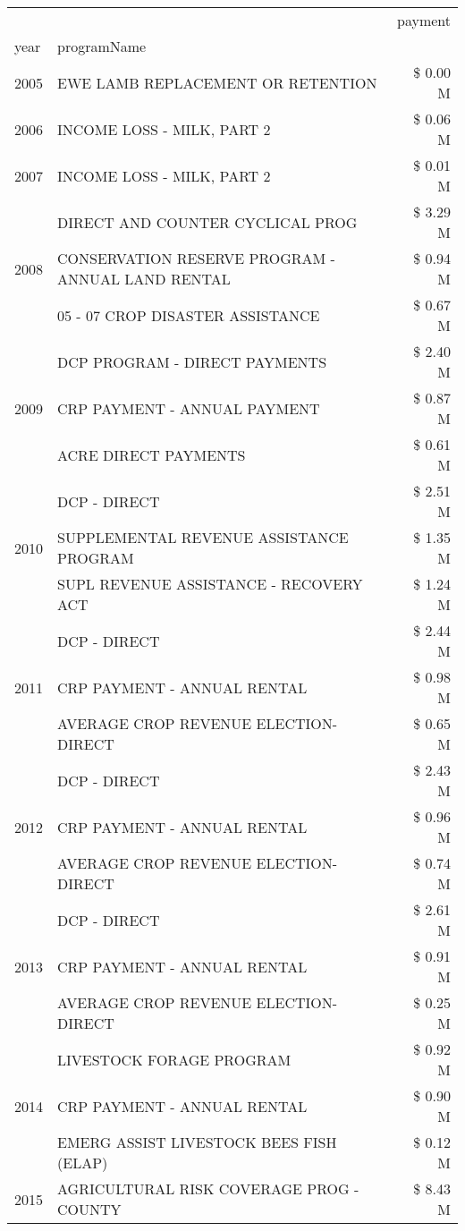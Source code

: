 \begin{tabular}{llr}
\toprule
 &  & payment \\
year & programName &  \\
\midrule
2005 & EWE LAMB REPLACEMENT OR RETENTION & \$ 0.00 M \\
\cline{1-3}
2006 & INCOME LOSS - MILK, PART 2 & \$ 0.06 M \\
\cline{1-3}
2007 & INCOME LOSS - MILK, PART 2 & \$ 0.01 M \\
\cline{1-3}
\multirow[t]{3}{*}{2008} & DIRECT AND COUNTER CYCLICAL PROG & \$ 3.29 M \\
 & CONSERVATION RESERVE PROGRAM - ANNUAL LAND RENTAL & \$ 0.94 M \\
 & 05 - 07 CROP DISASTER ASSISTANCE & \$ 0.67 M \\
\cline{1-3}
\multirow[t]{3}{*}{2009} & DCP PROGRAM - DIRECT PAYMENTS & \$ 2.40 M \\
 & CRP PAYMENT - ANNUAL PAYMENT & \$ 0.87 M \\
 & ACRE DIRECT PAYMENTS & \$ 0.61 M \\
\cline{1-3}
\multirow[t]{3}{*}{2010} & DCP - DIRECT & \$ 2.51 M \\
 & SUPPLEMENTAL REVENUE ASSISTANCE PROGRAM & \$ 1.35 M \\
 & SUPL REVENUE ASSISTANCE - RECOVERY ACT & \$ 1.24 M \\
\cline{1-3}
\multirow[t]{3}{*}{2011} & DCP - DIRECT & \$ 2.44 M \\
 & CRP PAYMENT - ANNUAL RENTAL & \$ 0.98 M \\
 & AVERAGE CROP REVENUE ELECTION-DIRECT & \$ 0.65 M \\
\cline{1-3}
\multirow[t]{3}{*}{2012} & DCP - DIRECT & \$ 2.43 M \\
 & CRP PAYMENT - ANNUAL RENTAL & \$ 0.96 M \\
 & AVERAGE CROP REVENUE ELECTION-DIRECT & \$ 0.74 M \\
\cline{1-3}
\multirow[t]{3}{*}{2013} & DCP - DIRECT & \$ 2.61 M \\
 & CRP PAYMENT - ANNUAL RENTAL & \$ 0.91 M \\
 & AVERAGE CROP REVENUE ELECTION-DIRECT & \$ 0.25 M \\
\cline{1-3}
\multirow[t]{3}{*}{2014} & LIVESTOCK FORAGE PROGRAM & \$ 0.92 M \\
 & CRP PAYMENT - ANNUAL RENTAL & \$ 0.90 M \\
 & EMERG ASSIST LIVESTOCK BEES FISH (ELAP) & \$ 0.12 M \\
\cline{1-3}
\multirow[t]{3}{*}{2015} & AGRICULTURAL RISK COVERAGE PROG - COUNTY & \$ 8.43 M \\

\end{tabular}

